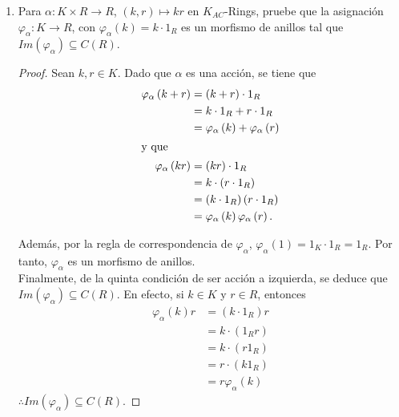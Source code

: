 \documentclass{article}
\newcommand{\lrprth}[1]{
	\left(#1\right)
}
\newcommand{\ringcenter}[1]{
	C\lrprth{#1}
}
\theoremstyle{definition}
\theoremstyle{plain}
\theoremstyle{plain}
\theoremstyle{definition}
\theoremstyle{definition}
\theoremstyle{definition}
\theoremstyle{definition}
\theoremstyle{definition}
\theoremstyle{definition}
\begin{document}
\begin{enumerate}[label=\textbf{Ej \arabic*.}]
\begin{proof}
\begin{align*}
				&=r_1\lrprth{\varphi(k)r_2}\\
				&=r_1\lrprth{k\bullet_\varphi r_2}.
			\end{align*}
			$\boxed{\text{(AC5)}}$ Sean $r\in R$. Así
			\begin{align*}
				1_K\bullet_\varphi r&=\varphi(1_K)r\\
				&=1_R\cdot r && ,\ \varphi\text{ es un morfismo de anillos.}\\
				\therefore & \ \lrprth{R,\bullet_\varphi}\in K_{Ac}-Rings.
			\end{align*}
		\end{proof}
		
		\item Para $\alpha : K \times R \longrightarrow R$, $\lrprth{k,r} \mapsto kr$ en $K_{AC}$-Rings, pruebe que la asignación $\varphi_{\alpha} : K \longrightarrow R$, con $\varphi_{\alpha}\lrprth{k}=k \cdot 1_{R}$ es un morfismo de anillos tal que $Im\lrprth{\varphi_{\alpha}}\subseteq \ringcenter{R}$.
		\begin{proof}
			Sean $k,r \in K$. Dado que $\alpha$ es una acción, se tiene que
			\begin{align*}
				\varphi_{\alpha}\lrprth{k+r}&=\lrprth{k+r}\cdot 1_{R}\\
				&=k \cdot 1_{R} + r \cdot 1_{R}\\
				&=\varphi_{\alpha}\lrprth{k}+\varphi_{\alpha}\lrprth{r}\\
				\intertext{y que}
				\varphi_{\alpha}\lrprth{kr}&=\lrprth{kr}\cdot 1_{R}\\
				&=k \cdot\lrprth{r \cdot 1_{R}}\\
				&=\lrprth{k \cdot 1_{R}}\lrprth{r \cdot 1_{R}}\\
				&=\varphi_{\alpha}\lrprth{k}\varphi_{\alpha}\lrprth{r}.
			\end{align*}
			
			Además, por la regla de correspondencia de $\varphi_{\alpha}$, $\varphi_{\alpha}\lrprth{1}=1_{K} \cdot 1_{R} = 1_{R}$. Por tanto, $\varphi_{\alpha}$ es un morfismo de anillos.\\
			
			Finalmente, de la quinta condición de ser acción a izquierda, se deduce que $Im\lrprth{\varphi_{\alpha}}\subseteq\ringcenter{R}$. En efecto, si $k \in K$ y $r \in R$, entonces
			\begin{align*}
				\varphi_{\alpha}\lrprth{k}r&=\lrprth{k \cdot 1_{R}}r\\
				&=k \cdot\lrprth{1_{R}r}\\
				&=k \cdot\lrprth{r1_{R}}\\
				&=r \cdot\lrprth{k1_{R}}\\
				&=r\varphi_{\alpha}\lrprth{k}
			\end{align*}
			$\therefore Im\lrprth{\varphi_{\alpha}}\subseteq \ringcenter{R}$.
		\end{proof}
		

\end{enumerate}
\end{document}
